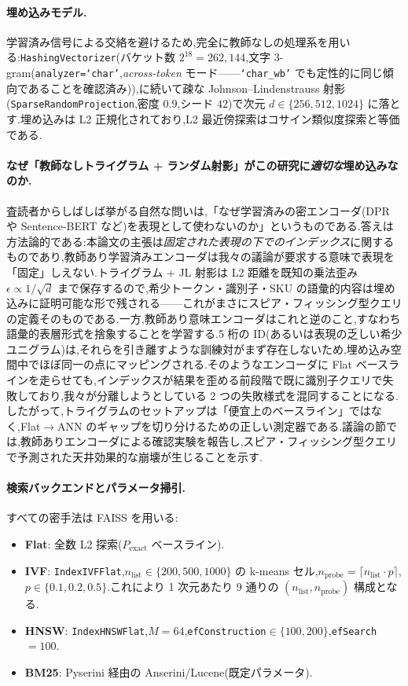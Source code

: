 \documentclass[conference]{IEEEtran}
\begin{document}
\paragraph{埋め込みモデル.}
学習済み信号による交絡を避けるため,完全に教師なしの処理系を用いる:\texttt{HashingVectorizer}(バケット数 $2^{18}{=}262{,}144$,文字 $3$-gram(\texttt{analyzer=`char'},\emph{across-token} モード——\texttt{`char\_wb'} でも定性的に同じ傾向であることを確認済み)),に続いて疎な Johnson--Lindenstrauss 射影(\texttt{SparseRandomProjection},密度 $0.9$,シード $42$)で次元 $d\in\{256,512,1024\}$ に落とす.埋め込みは L2 正規化されており,L2 最近傍探索はコサイン類似度探索と等価である.

\paragraph{なぜ「教師なしトライグラム + ランダム射影」がこの研究に\emph{適切な}埋め込みなのか.}
査読者からしばしば挙がる自然な問いは,「なぜ学習済みの密エンコーダ(DPR や Sentence-BERT など)を表現として使わないのか」というものである.答えは方法論的である:本論文の主張は\emph{固定された表現の下でのインデックス}に関するものであり,教師あり学習済みエンコーダは我々の議論が要求する意味で表現を「固定」しえない.トライグラム + JL 射影は L2 距離を既知の乗法歪み $\epsilon\!\propto\!1/\sqrt{d}$ まで保存するので,希少トークン・識別子・SKU の語彙的内容は埋め込みに証明可能な形で残される——これがまさにスピア・フィッシング型クエリの定義そのものである.一方,教師あり意味エンコーダはこれと逆のこと,すなわち語彙的表層形式を捨象することを学習する.5 桁の ID(あるいは表現の乏しい希少ユニグラム)は,それらを引き離すような訓練対がまず存在しないため,埋め込み空間中でほぼ同一の点にマッピングされる.そのようなエンコーダに Flat ベースラインを走らせても,インデックスが結果を歪める前段階で既に識別子クエリで失敗しており,我々が分離しようとしている 2 つの失敗様式を混同することになる.したがって,トライグラムのセットアップは「便宜上のベースライン」ではなく,Flat$\to$ANN のギャップを切り分けるための正しい測定器である.議論の節では,教師ありエンコーダによる確認実験を報告し,スピア・フィッシング型クエリで予測された天井効果的な崩壊が生じることを示す.

\paragraph{検索バックエンドとパラメータ掃引.} すべての密手法は FAISS を用いる:
\begin{itemize}
\item \textbf{Flat}: 全数 L2 探索($P_{\text{exact}}$ ベースライン).
\item \textbf{IVF}: \texttt{IndexIVFFlat},$n_{\text{list}}\in\{200,500,1000\}$ の k-means セル,$n_{\text{probe}}=\lceil n_{\text{list}}\cdot p\rceil$,$p\in\{0.1,0.2,0.5\}$.これにより 1 次元あたり 9 通りの $(n_{\text{list}},n_{\text{probe}})$ 構成となる.
\item \textbf{HNSW}: \texttt{IndexHNSWFlat},$M{=}64$,\texttt{efConstruction}$\in\{100,200\}$,\texttt{efSearch}$=100$.
\item \textbf{BM25}: Pyserini \cite{lin2021pyserini} 経由の Anserini/Lucene(既定パラメータ).
\end{itemize}
\end{document}
